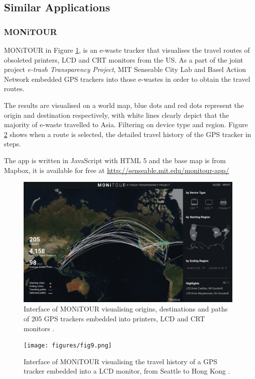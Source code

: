 \documentclass[11pt,a4paper]{article}
\begin{document}
\subsection{Similar Applications}
\subsubsection{MONiTOUR}\label{sec:monitour}
MONiTOUR \parencite{SenseableCityLab-Ewaste} in Figure \ref{fig:8}, is an e-waste tracker that visualises the travel routes of obsoleted printers, LCD and CRT monitors from the US. As a part of the joint project \textit{e-trash Transparency Project}, MIT Senseable City Lab and Basel Action Network embedded GPS trackers into those e-wastes in order to obtain the travel routes. 

The results are visualised on a world map, blue dots and red dots represent the origin and destination respectively, with white lines clearly depict that the majority of e-waste travelled to Asia. Filtering on device type and region. Figure \ref{fig:9} shows when a route is selected, the detailed travel history of the GPS tracker in steps. 

The app is written in JavaScript with HTML 5 and the base map is from Mapbox, it is available for free at \url{http://senseable.mit.edu/monitour-app/}

\begin{figure}[H]
	\centering
	\includegraphics[width=\textwidth,keepaspectratio]{figures/fig8.png}
	\caption{\label{fig:8}Interface of MONiTOUR visualising origins, destinations and paths of 205 GPS trackers embedded into printers, LCD and CRT monitors \parencite{SenseableCityLab-Ewaste}.}
\end{figure}

\begin{figure}[H]
	\centering
	\texttt{[image: figures/fig9.png]}
	\caption{\label{fig:9}Interface of MONiTOUR visualising the travel history of a GPS tracker embedded into a LCD monitor, from Seattle to Hong Kong \parencite{SenseableCityLab-Seattle}.}
\end{figure}
\end{document}
